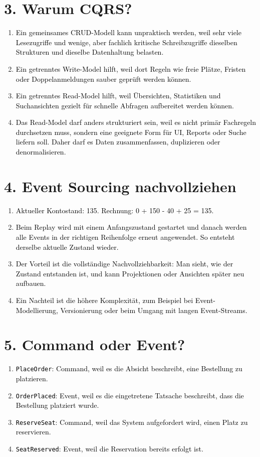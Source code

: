\documentclass[11pt,a4paper]{article}
\newcommand{\solution}[1]{\textcolor{black}{#1}}
\begin{document}
\section*{3. Warum CQRS?}
\begin{enumerate}
  \item \solution{Ein gemeinsames CRUD-Modell kann unpraktisch werden, weil sehr viele Lesezugriffe und wenige, aber fachlich kritische Schreibzugriffe dieselben Strukturen und dieselbe Datenhaltung belasten.}
  \item \solution{Ein getrenntes Write-Model hilft, weil dort Regeln wie freie Plätze, Fristen oder Doppelanmeldungen sauber geprüft werden können.}
  \item \solution{Ein getrenntes Read-Model hilft, weil Übersichten, Statistiken und Suchansichten gezielt für schnelle Abfragen aufbereitet werden können.}
  \item \solution{Das Read-Model darf anders strukturiert sein, weil es nicht primär Fachregeln durchsetzen muss, sondern eine geeignete Form für UI, Reports oder Suche liefern soll. Daher darf es Daten zusammenfassen, duplizieren oder denormalisieren.}
\end{enumerate}

\section*{4. Event Sourcing nachvollziehen}
\begin{enumerate}
  \item \solution{Aktueller Kontostand: 135. Rechnung: 0 + 150 - 40 + 25 = 135.}
  \item \solution{Beim Replay wird mit einem Anfangszustand gestartet und danach werden alle Events in der richtigen Reihenfolge erneut angewendet. So entsteht derselbe aktuelle Zustand wieder.}
  \item \solution{Der Vorteil ist die vollständige Nachvollziehbarkeit: Man sieht, wie der Zustand entstanden ist, und kann Projektionen oder Ansichten später neu aufbauen.}
  \item \solution{Ein Nachteil ist die höhere Komplexität, zum Beispiel bei Event-Modellierung, Versionierung oder beim Umgang mit langen Event-Streams.}
\end{enumerate}

\section*{5. Command oder Event?}
\begin{enumerate}
  \item \solution{\texttt{PlaceOrder}: Command, weil es die Absicht beschreibt, eine Bestellung zu platzieren.}
  \item \solution{\texttt{OrderPlaced}: Event, weil es die eingetretene Tatsache beschreibt, dass die Bestellung platziert wurde.}
  \item \solution{\texttt{ReserveSeat}: Command, weil das System aufgefordert wird, einen Platz zu reservieren.}
  \item \solution{\texttt{SeatReserved}: Event, weil die Reservation bereits erfolgt ist.}
\end{enumerate}
\end{document}
